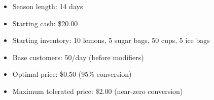 \begin{itemize}
    \item Season length: 14 days
    \item Starting cash: \$20.00
    \item Starting inventory: 10 lemons, 5 sugar bags, 50 cups, 5 ice bags
    \item Base customers: 50/day (before modifiers)
    \item Optimal price: \$0.50 (95\% conversion)
    \item Maximum tolerated price: \$2.00 (near-zero conversion)
\end{itemize}



